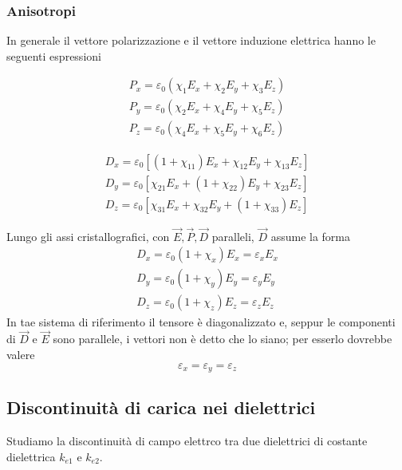 \documentclass[x11names]{report}
\begin{document}
\subsubsection{Anisotropi}
In generale il vettore polarizzazione e il vettore induzione elettrica hanno le seguenti espressioni
\begin{minipage}{0.5\textwidth}
	\begin{gather*}
		P_x = \varepsilon_0\left(\chi_{1}E_x + \chi_{2}E_y + \chi_{3}E_z \right) \\
		P_y = \varepsilon_0\left(\chi_{2}E_x + \chi_{4}E_y + \chi_{5}E_z \right)\\
		P_z = \varepsilon_0\left(\chi_{4}E_x + \chi_{5}E_y + \chi_{6}E_z \right)
	\end{gather*}
\end{minipage}
\begin{minipage}{0.5\textwidth}
	\begin{gather*}
		D_x = \varepsilon_0\left[(1+\chi_{11})E_x + \chi_{12}E_y + \chi_{13}E_z \right] \\
		D_y = \varepsilon_0\left[\chi_{21}E_x + (1+\chi_{22})E_y + \chi_{23}E_z \right] \\
		D_z = \varepsilon_0\left[\chi_{31}E_x + \chi_{32}E_y + (1+\chi_{33})E_z \right]
	\end{gather*}
\end{minipage}\vspace{0.4cm}
\noindent
Lungo gli assi cristallografici, con \(\vec{E},\vec{P},\vec{D}\) paralleli,  \(\vec{D}\) assume la forma
 \begin{gather*}
	D_x = \varepsilon_0\left(1 + \chi_{x}\right)E_x = \varepsilon_x E_x \\
	D_y = \varepsilon_0\left(1 + \chi_{y}\right)E_y = \varepsilon_y E_y\\
	D_z = \varepsilon_0\left(1 + \chi_{z}\right)E_z = \varepsilon_z E_z
\end{gather*}
In tae sistema di riferimento il tensore è diagonalizzato e, seppur le componenti di \(\vec{D}\) e \(\vec{E}\) sono parallele, i vettori non è detto che lo siano; per esserlo dovrebbe valere
\[
\varepsilon_x = \varepsilon_y = \varepsilon_z 
\]

\subsection{Discontinuità di carica nei dielettrici}
Studiamo la discontinuità di campo elettrco tra due dielettrici di costante dielettrica \(k_{e1}\) e \(k_{e2}\).
\end{document}

